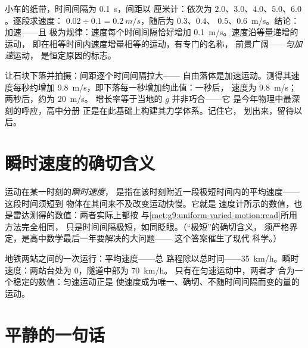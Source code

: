 \begin{example}[纸带计算示例]\label{ex:g9:uniform-varied-motion:worked}
小车的纸带，时间间隔为 \qty{0.1}{s}，间距以
厘米计：依次为 $2.0$、$3.0$、$4.0$、$5.0$、$6.0$。逐段求速度：
$0.02 \div 0.1 = \qty{0.2}{m/s}$，随后为 $0.3$、$0.4$、
$0.5$、\qty{0.6}{m/s}。结论：加速——且
极为规律：速度每个时间间隔恰好增加
\qty{0.1}{m/s}。速度沿等量递增的运动，
即在相等时间内速度增量相等的运动，有专门的名称，
前景广阔——\emph{匀加速}运动，
是恒定原因的标志。
\end{example}

\begin{example}[最著名的加速运动]\label{ex:g9:uniform-varied-motion:freefall}
让石块下落并拍摄：间距逐个时间间隔拉大——
自由落体是加速运动。测得其速度每秒约增加
\qty{9.8}{m/s}，即下落每一秒增加约此值：一秒后，
速度为 \qty{9.8}{m/s}；两秒后，约为 \qty{20}{m/s}。
增长率等于当地的 $g$ 并非巧合——它
是今年物理中最深刻的呼应，高中分册
正是在此基础上构建其力学体系。记住它，
划出来，留待以后。
\end{example}

\section{瞬时速度的确切含义}

\begin{definition}[瞬时速度]\label{def:g9:uniform-varied-motion:instant}
运动在某一时刻的\emph{瞬时速度}，
是指在该时刻附近一段极短时间内的平均速度——
这段时间须短到
物体在其间来不及改变运动快慢。它就是
速度计所示的数值，也是雷达测得的数值：两者实际上都按
与\cref{met:g9:uniform-varied-motion:read}所用方法完全相同，
只是时间间隔极短，如同眨眼。（“极短”的确切含义，
须严格界定，是高中数学最后一年要解决的大问题——
这个答案催生了现代
科学。）
\end{definition}

\begin{example}[平均速度与瞬时速度对照]\label{ex:g9:uniform-varied-motion:sidebyside}
地铁两站之间的一次运行：平均速度——总
路程除以总时间——\qty{35}{km/h}。瞬时
速度：两站台处为 $0$，隧道中部为 \qty{70}{km/h}。
只有在匀速运动中，两者才
合为一个稳定的数值：匀速运动正是
使速度成为唯一、确切、不随时间间隔而变的量的运动。
\end{example}

\section{平静的一句话}

